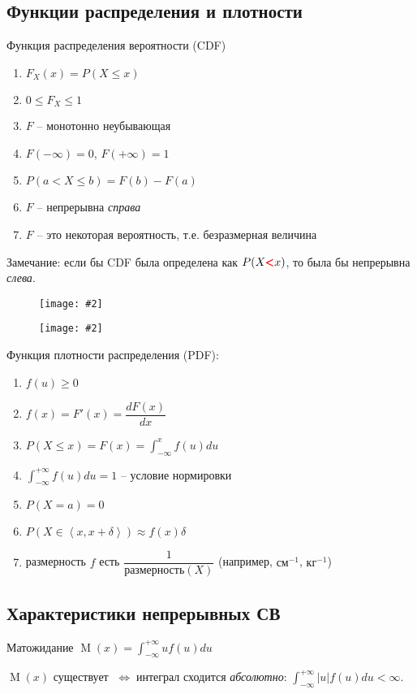 \documentclass[a4paper,12pt,fleqn]{article}
\newenvironment{onsamepage} {\begin{minipage}{\textwidth}} {\end{minipage}}
\numberwithin{figure}{section}
\newcommand\cfigure[2]{
	\begin{figure}[H] \centering \texttt{[image: \#2]} \end{figure}
}
\theoremstyle{definition}
\let\leqs\leqslant
\let\geqs\geqslant
\let\DS\displaystyle
\DeclareMathOperator{\M}{M}
\def\iff{$\;\Longleftrightarrow\;$}
\begin{document}
\subsection{Функции распределения и плотности}

Функция распределения вероятности (CDF)
\begin{enumerate}
	\item $F_X(x) = P(X \leqs x)$
	\item $0\leqs F_X \leqs 1$
	\item $F$ -- монотонно неубывающая
	\item $F(-\infty)=0$, $F(+\infty)=1$
	\item $P(a< X \leqs b) = F(b)-F(a)$
	\item $F$ -- непрерывна \textit{справа}
	\item $F$ -- это некоторая вероятность, т.е. безразмерная величина
\end{enumerate}

Замечание: если бы CDF была определена как
$P(X {\pmb{\textcolor{red}<}} x)$,
то была бы непрерывна \textit{слева}.

\cfigure{11cm}{cdf-example-big.png}

\cfigure{6cm}{cdf-example-small.jpg}

Функция плотности распределения (PDF):
\begin{enumerate}
	\item $f(u) \geqs 0$
	\item $f(x)=F'(x)=\dfrac{dF(x)}{dx}$
	\item $\DS P(X\leqs x)=F(x)=\int_{-\infty}^{x}f(u)du$
	\item $\DS \int_{-\infty}^{+\infty}f(u)du=1$ -- условие нормировки
	\item $P(X=a)=0$
	\item $P(X \in \left<x,x+\delta\right>) \approx f(x) \delta$
	\item размерность $f$ есть $\dfrac{1}{\text{размерность}(X)}$
		  (например, $\text{см}^{-1}$, $\text{кг}^{-1}$)
\end{enumerate}


\subsection{Характеристики непрерывных СВ}

\begin{onsamepage}
Матожидание $\M(x)=\int_{-\infty}^{+\infty}uf(u)du$

$\M(x)$ существует \iff интеграл сходится \textit{абсолютно}:
$\int_{-\infty}^{+\infty}|u|f(u)du < \infty$.
\end{onsamepage}
\end{document}
